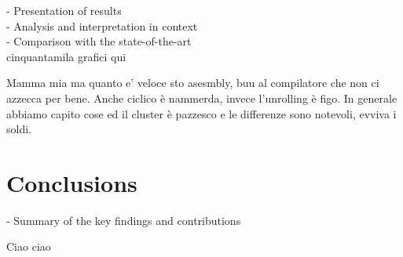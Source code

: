 \documentclass[conference]{IEEEtran}
\begin{document}
- Presentation of results \\
- Analysis and interpretation in context \\
- Comparison with the state-of-the-art \\

cinquantamila grafici qui

Mamma mia ma quanto e' veloce sto asesmbly,
buu al compilatore che non ci azzecca per bene. 
Anche ciclico è nammerda, invece l'unrolling
è figo.
In generale abbiamo capito
cose ed il cluster è pazzesco e le differenze
sono notevoli, evviva i soldi.


\section{Conclusions}

- Summary of the key findings and contributions

Ciao ciao
\end{document}
